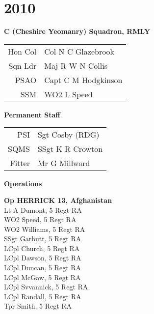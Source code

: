 \chapter*{2010}

\vspace*{20mm}

\begin{center}
  \Large
  \textbf{C (Cheshire Yeomanry) Squadron, RMLY}
\end{center}

\begin{center}
  \begin{tabular}{rl}
    Hon Col & Col N C Glazebrook \\
    Sqn Ldr & Maj R W N Collis \\
    PSAO & Capt C M Hodgkinson \\
    SSM & WO2 L Speed \\
  \end{tabular}
\end{center}

\vspace*{10mm}

\begin{center}
  \Large
  \textbf{Permanent Staff}
\end{center}

\begin{center}
  \begin{tabular}{rl}
    PSI & Sgt Cosby (RDG) \\
    SQMS & SSgt K R Crowton \\
    Fitter & Mr G Millward \\
  \end{tabular}
\end{center}

\vspace*{10mm}

\begin{center}
  \Large
  \textbf{Operations}
\end{center}

\begin{multicols}{2}
  \noindent
  \textbf{Op HERRICK 13, Afghanistan} \\
  Lt A Dumont, 5 Regt RA \\
  WO2 Speed, 5 Regt RA \\
  WO2 Williams, 5 Regt RA \\
  SSgt Garbutt, 5 Regt RA \\
  LCpl Church, 5 Regt RA \\
  LCpl Dawson, 5 Regt RA \\
  LCpl Duncan, 5 Regt RA \\
  LCpl McGaw, 5 Regt RA \\
  LCpl Svvannick, 5 Regt RA \\
  LCpl Randall, 5 Regt RA \\
  Tpr Smith, 5 Regt RA \\
\end{multicols}

